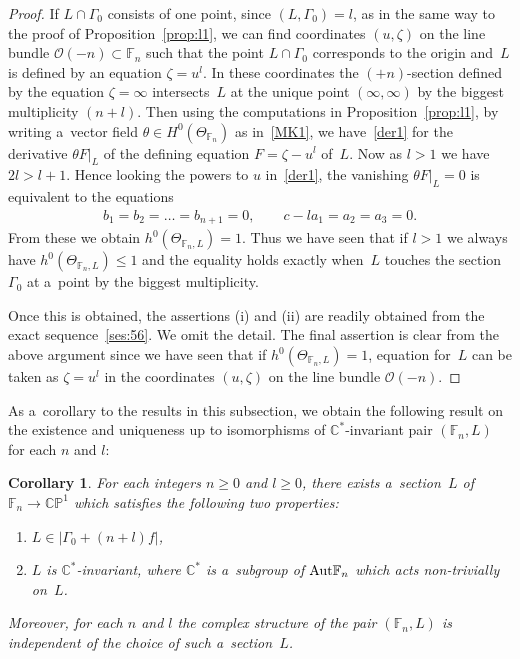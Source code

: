 \documentclass[11pt]{article}
\numberwithin{equation}{section}
\newtheorem{Corollary}[Theorem]{Corollary}
\begin{document}
\begin{proof}
If $L\cap \Gamma_0$ consists of one point, since $(L,\Gamma_0)=l$, as in the same way to the proof of
Proposition~\ref{prop:l1}, we can f\/ind coordinates $(u,\zeta)$ on the line bundle $\mathscr O(-n)\subset\mathbb{F}_n$
such that the point $L\cap \Gamma_0$ corresponds to the origin and~$L$ is def\/ined by an equation $\zeta = u^l$.
In these coordinates the $(+n)$-section def\/ined by the equation $\zeta=\infty$ intersects~$L$ at the unique point
$(\infty,\infty)$ by the biggest multiplicity $(n+l)$.
Then using the computations in Proposition~\ref{prop:l1}, by writing a~vector f\/ield $\theta\in H^0(\Theta_{\mathbb{F}_n})$
as in~\eqref{MK1}, we have~\eqref{der1} for the derivative $\theta F|_L$ of the def\/ining equation $F=\zeta-u^l$ of~$L$.
Now as $l>1$ we have $2l>l+1$.
Hence looking the powers to $u$ in~\eqref{der1}, the vanishing $\theta F|_L = 0$ is equivalent to the equations
\begin{gather*}
b_1=b_2=\dots=b_{n+1} = 0,
\qquad
c-la_1 = a_2 = a_3 = 0.
\end{gather*}
From these we obtain $h^0(\Theta_{\mathbb{F}_n, L})=1$.
Thus we have seen that if $l>1$ we always have \mbox{$h^0(\Theta_{\mathbb{F}_n,L}) \le 1$} and the equality holds exactly
when~$L$ touches the section $\Gamma_0$ at a~point by the biggest multiplicity.

Once this is obtained, the assertions (i) and (ii) are readily obtained from the exact sequence~\eqref{ses:56}.
We omit the detail.
The f\/inal assertion is clear from the above argument since we have seen that if $h^0(\Theta_{\mathbb{F}_n,L}) = 1$,
equation for~$L$ can be taken as $\zeta=u^l$ in the coordinates $(u,\zeta)$ on the line bundle $\mathscr O(-n)$.
\end{proof}

As a~corollary to the results in this subsection, we obtain the following result on the existence and uniqueness up to
isomorphisms of $\mathbb{C}^*$-invariant pair $(\mathbb{F}_n,L)$ for each $n$ and $l$:

\begin{Corollary}\label{cor:unique}
For each integers $n\ge 0$ and $l\ge 0$, there exists a~section~$L$ of $\mathbb{F}_n\to\mathbb{CP}^1$ which satisfies
the following two properties:
\begin{enumerate}\itemsep=0pt
\item[$(i)$] $L\in |\Gamma_0+(n+l)f|$,
\item[$(ii)$] $L$ is $\mathbb{C}^*$-invariant, where $\mathbb{C}^*$ is a~subgroup of ${\rm{Aut}}\mathbb{F}_n$ which acts
non-trivially on~$L$.
\end{enumerate}
Moreover, for each $n$ and $l$ the complex structure of the pair $(\mathbb{F}_n,L)$ is independent of the choice of such
a~section~$L$.
\end{Corollary}
\end{document}
